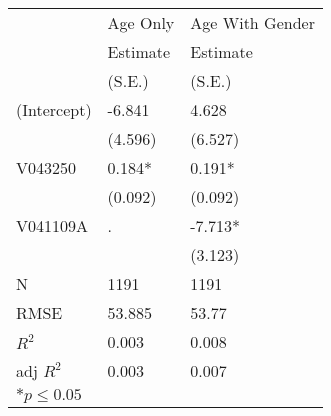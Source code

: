 \begin{tabular}{*{3}{l}}
 \hline
                & Age Only & Age With Gender   \\
                &Estimate &Estimate\\
                &(S.E.)  &(S.E.) \\
 \hline
 \hline
  (Intercept)    & -6.841 &  4.628 \\
               &(4.596)  &(6.527)  \\
  V043250        &  0.184* &  0.191* \\
               &(0.092)  &(0.092)  \\
  V041109A        & .      & -7.713* \\
               &        &(3.123)  \\
 \hline 
 N                &1191      &1191       \\
 RMSE            &53.885  &53.77   \\
 $R^2$           &0.003  &0.008   \\
 adj $R^2$       &0.003  &0.007   \\
 \hline
 \hline
 
 \multicolumn{2}{l}{${*}  p \le 0.05$   }\\
 \end{tabular}